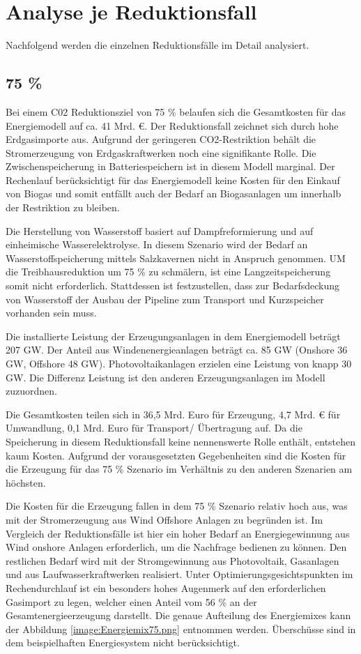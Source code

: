 \section{Analyse je Reduktionsfall}
Nachfolgend werden die einzelnen Reduktionsfälle im Detail analysiert.

\subsection{75 \%}
Bei einem C02 Reduktionsziel von 75 \% belaufen sich die Gesamtkosten für das Energiemodell auf ca. 41 Mrd. €. Der Reduktionsfall zeichnet sich durch hohe Erdgasimporte aus. Aufgrund der geringeren CO2-Restriktion behält die Stromerzeugung von Erdgaskraftwerken noch eine signifikante Rolle. Die Zwischenspeicherung in Batteriespeichern ist in diesem Modell marginal. Der Rechenlauf berücksichtigt für das Energiemodell keine Kosten für den Einkauf von Biogas und somit entfällt auch der Bedarf an Biogasanlagen um innerhalb der Restriktion zu bleiben. 

Die Herstellung von Wasserstoff basiert auf Dampfreformierung und auf einheimische Wasserelektrolyse. In diesem Szenario wird der Bedarf an Wasserstoffspeicherung mittels Salzkavernen nicht in Anspruch genommen. UM die Treibhausreduktion um 75 \% zu schmälern, ist eine Langzeitspeicherung somit nicht erforderlich. Stattdessen ist festzustellen, dass zur Bedarfsdeckung von Wasserstoff der Ausbau der Pipeline zum Transport und Kurzspeicher vorhanden sein muss. 

Die installierte Leistung der Erzeugungsanlagen in dem Energiemodell beträgt 207 GW.  Der Anteil aus Windenenergieanlagen beträgt ca. 85 GW (Onshore 36 GW, Offshore 48 GW). Photovoltaikanlagen erzielen eine Leistung von knapp 30 GW. Die Differenz Leistung ist den anderen Erzeugungsanlagen im Modell zuzuordnen. 

Die Gesamtkosten teilen sich in 36,5 Mrd. Euro für Erzeugung, 4,7 Mrd. € für Umwandlung, 0,1 Mrd. Euro für Transport/ Übertragung auf. Da die Speicherung in diesem Reduktionsfall keine nennenswerte Rolle enthält, entstehen kaum Kosten. Aufgrund der vorausgesetzten Gegebenheiten sind die Kosten für die Erzeugung für das 75 \% Szenario im Verhältnis zu den anderen Szenarien am höchsten. 

Die Kosten für die Erzeugung fallen in dem 75 \% Szenario relativ hoch aus, was mit der Stromerzeugung aus Wind Offshore Anlagen zu begründen ist. Im Vergleich der Reduktionsfälle ist hier ein hoher Bedarf an Energiegewinnung aus Wind onshore Anlagen erforderlich, um die Nachfrage bedienen zu können. Den restlichen Bedarf wird mit der Stromgewinnung aus Photovoltaik, Gasanlagen und aus Laufwasserkraftwerken realisiert. Unter Optimierungsgesichtspunkten im Rechendurchlauf ist ein besonders hohes Augenmerk auf den erforderlichen Gasimport zu legen, welcher einen Anteil vom 56 \% an der Gesamtenergieerzeugung darstellt. Die genaue Aufteilung des Energiemixes kann der Abbildung \ref{image:Energiemix75.png} entnommen werden. Überschüsse sind in dem beispielhaften Energiesystem nicht berücksichtigt.
 

